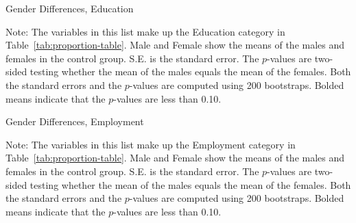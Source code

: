 \begin{table}
\centering
\caption{Gender Differences, Education}\label{tab:tab1-ed}
\begin{adjustbox}{width=0.8\textwidth}
\begin{threeparttable}

\begin{tablenotes}
\footnotesize
\item Note: The variables in this list make up the Education category in Table~\ref{tab:proportion-table}. Male and Female show the means of the males and females in the control group. S.E. is the standard error. The $p$-values are two-sided testing whether the mean of the males equals the mean of the females. Both the standard errors and the $p$-values are computed using 200 bootstraps. Bolded means indicate that the $p$-values are less than 0.10.
\end{tablenotes}
\end{threeparttable}
\end{adjustbox}
\end{table}

\begin{table}
\centering
\caption{Gender Differences, Employment}\label{tab:tab1-emp}
\begin{adjustbox}{width=0.9\textwidth}
\begin{threeparttable}

\begin{tablenotes}
\footnotesize
\item Note: The variables in this list make up the Employment category in Table~\ref{tab:proportion-table}. Male and Female show the means of the males and females in the control group. S.E. is the standard error. The $p$-values are two-sided testing whether the mean of the males equals the mean of the females. Both the standard errors and the $p$-values are computed using 200 bootstraps. Bolded means indicate that the $p$-values are less than 0.10.
\end{tablenotes}
\end{threeparttable}
\end{adjustbox}
\end{table}

